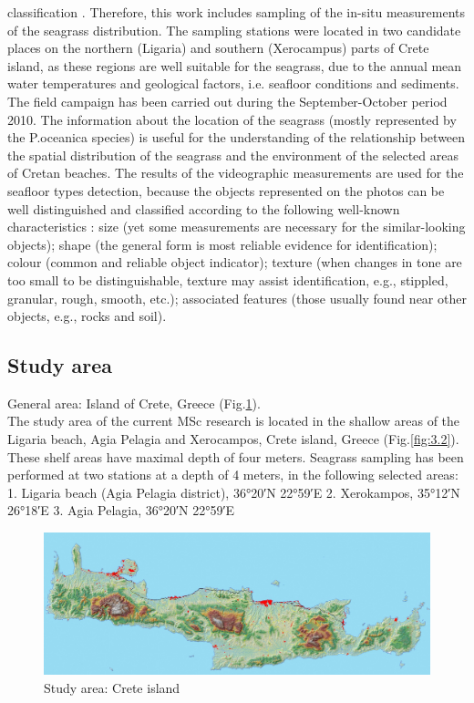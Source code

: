 \documentclass[10pt, a4paper]{article}
\begin{document}
classification \cite{Pasqualini98a}\label{Pasqualini98a}. Therefore, this work includes sampling of the in-situ
measurements of the seagrass distribution.
The sampling stations were located in two candidate places on the northern (Ligaria) and southern
(Xerocampus) parts of Crete island, as these regions are well suitable for the seagrass, due to the
annual mean water temperatures and geological factors, i.e. seafloor conditions and sediments. \\ The
field campaign has been carried out during the September-October period 2010. 
The information about the location of the seagrass (mostly represented by the P.oceanica species) is useful for the
understanding of the relationship between the spatial distribution of the seagrass and the environment
of the selected areas of Cretan beaches. The results of the videographic measurements are used for the
seafloor types detection, because the objects represented on the photos can be well distinguished and
classified according to the following well-known characteristics \cite{Butler87}\label{Butler87}: size (yet some
measurements are necessary for the similar-looking objects); shape (the general form is most reliable
evidence for identification); colour (common and reliable object indicator); texture (when changes in
tone are too small to be distinguishable, texture may assist identification, e.g., stippled, granular,
rough, smooth, etc.); associated features (those usually found near other objects, e.g., rocks and soil).

\subsection{Study area}
General area: Island of Crete, Greece (Fig.\ref{fig:3.1}).\\
The study area of the current MSc research is located in the shallow areas of the Ligaria beach, Agia
Pelagia and Xerocampos, Crete island, Greece (Fig.\ref{fig:3.2}). These shelf areas have maximal depth of four meters.
Seagrass sampling has been performed at two stations at a depth of 4 meters, in the following selected
areas:
1. Ligaria beach (Agia Pelagia district), 36°20′N 22°59′E
2. Xerokampos, 35°12′N 26°18′E
3. Agia Pelagia, 36°20′N 22°59′E

\begin{figure}[h]
	\centering
	\includegraphics[scale=0.10]{Fig-16.jpg}
	\caption{Study area: Crete island}
	\label{fig:3.1}
\end{figure}
\end{document}
